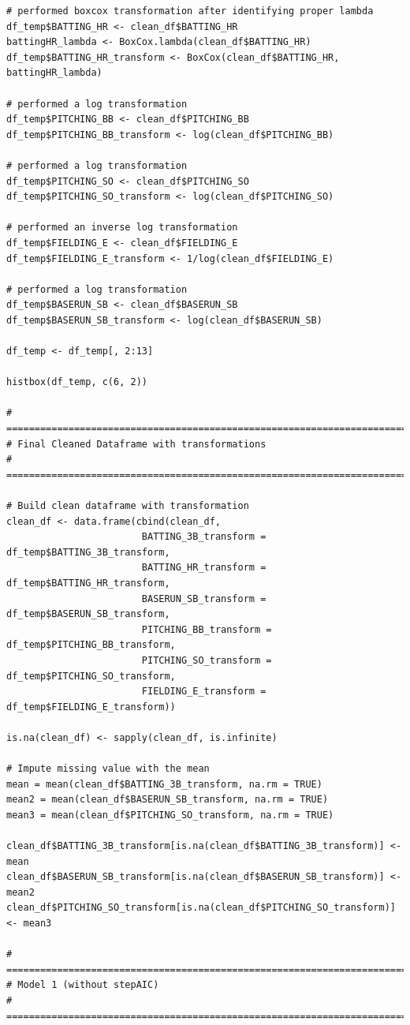 \documentclass[
]{article}
\begin{document}
\begin{verbatim}
# performed boxcox transformation after identifying proper lambda
df_temp$BATTING_HR <- clean_df$BATTING_HR
battingHR_lambda <- BoxCox.lambda(clean_df$BATTING_HR)
df_temp$BATTING_HR_transform <- BoxCox(clean_df$BATTING_HR, battingHR_lambda)

# performed a log transformation
df_temp$PITCHING_BB <- clean_df$PITCHING_BB
df_temp$PITCHING_BB_transform <- log(clean_df$PITCHING_BB)

# performed a log transformation
df_temp$PITCHING_SO <- clean_df$PITCHING_SO
df_temp$PITCHING_SO_transform <- log(clean_df$PITCHING_SO)

# performed an inverse log transformation
df_temp$FIELDING_E <- clean_df$FIELDING_E
df_temp$FIELDING_E_transform <- 1/log(clean_df$FIELDING_E)

# performed a log transformation
df_temp$BASERUN_SB <- clean_df$BASERUN_SB
df_temp$BASERUN_SB_transform <- log(clean_df$BASERUN_SB)

df_temp <- df_temp[, 2:13]

histbox(df_temp, c(6, 2))

# =====================================================================================
# Final Cleaned Dataframe with transformations
# =====================================================================================

# Build clean dataframe with transformation
clean_df <- data.frame(cbind(clean_df, 
                        BATTING_3B_transform = df_temp$BATTING_3B_transform,
                        BATTING_HR_transform = df_temp$BATTING_HR_transform,
                        BASERUN_SB_transform = df_temp$BASERUN_SB_transform,
                        PITCHING_BB_transform = df_temp$PITCHING_BB_transform,
                        PITCHING_SO_transform = df_temp$PITCHING_SO_transform,
                        FIELDING_E_transform = df_temp$FIELDING_E_transform))

is.na(clean_df) <- sapply(clean_df, is.infinite)

# Impute missing value with the mean
mean = mean(clean_df$BATTING_3B_transform, na.rm = TRUE)
mean2 = mean(clean_df$BASERUN_SB_transform, na.rm = TRUE)
mean3 = mean(clean_df$PITCHING_SO_transform, na.rm = TRUE)

clean_df$BATTING_3B_transform[is.na(clean_df$BATTING_3B_transform)] <- mean
clean_df$BASERUN_SB_transform[is.na(clean_df$BASERUN_SB_transform)] <- mean2
clean_df$PITCHING_SO_transform[is.na(clean_df$PITCHING_SO_transform)] <- mean3

# =====================================================================================
# Model 1 (without stepAIC)
# =====================================================================================


\end{verbatim}
\end{document}
